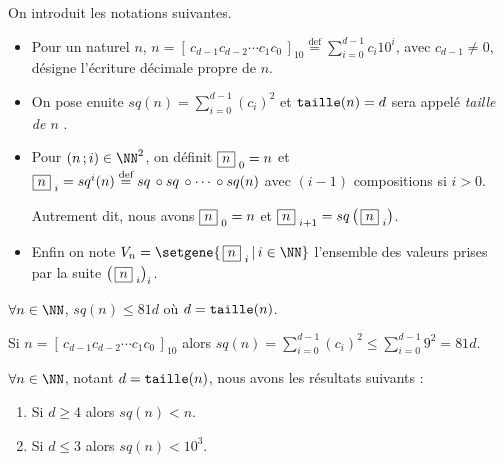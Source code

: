On introduit les notations suivantes.
\begin{itemize}[label = \textbullet]
    \item Pour un naturel $n$,
    $\displaystyle      n =  \left[ \, c_{d-1} c_{d-2} \cdots c_1 c_0 \, \right]_{10}
    \stackrel{\text{def}}{=} \sum_{i=0}^{d-1} c_i 10^i$,
    avec $c_{d-1} \neq 0$, désigne l'écriture décimale propre de $n$.

    \item On pose enuite
    $\displaystyle sq(n) = \sum_{i=0}^{d-1} (c_i)^2$
    et
    $\operatorname{\text{\normalfont\texttt{taille}}}(n) = d$ sera appelé \emph{\og taille de $n$ \fg}.


    \item Pour $(n \,; i) \in \NN^2$, on définit
    $  \fbox{$n$}_{\,\,0} = n$
    et
    $  \fbox{$n$}_{\,\,i} = sq^i(n)
    \stackrel{\text{def}}{=} sq \,\circ sq \,\circ \cdots \,\circ sq(n)$ avec $(i-1)$ compositions si $i > 0$.


    \smallskip\noindent
    Autrement dit, nous avons
    $\fbox{$n$}_{\,\,0} = n$
    et
    $\fbox{$n$}_{\,\,i+1} = sq \left( \, \fbox{$n$}_{\,\,i} \right)$.


    \item Enfin on note
    $V_n = \setgene{ \, \sqseq{n}{i} \, | \, i \in \NN }$
    l'ensemble des valeurs prises par la suite $\left( \, \fbox{$n$}_{\,\,i} \right)_i$.
\end{itemize}



\bigskip

\begin{fact}
    $\forall n \in \NN$, $sq(n) \leqslant 81 d$ où $d = \operatorname{\text{\normalfont\texttt{taille}}}(n)$.
\end{fact}

\begin{proof*}
    Si $n = \left[ \, c_{d-1} c_{d-2} \cdots c_1 c_0 \, \right]_{10}$
    alors
    $\displaystyle sq(n) = \sum_{i=0}^{d-1} (c_i)^2 \leqslant \sum_{i=0}^{d-1} 9^2 = 81 d $.
\end{proof*}




\medskip

\begin{fact}\label{magicmajo}
    $\forall n \in \NN$, notant $d = \operatorname{\text{\normalfont\texttt{taille}}}(n)$, nous avons les résultats suivants :

    \begin{enumerate}
        \item Si $d \geqslant 4$ alors $sq(n) < n$.

        \item Si $d \leqslant 3$ alors $sq(n) < 10^3$.
    \end{enumerate}
\end{fact}

